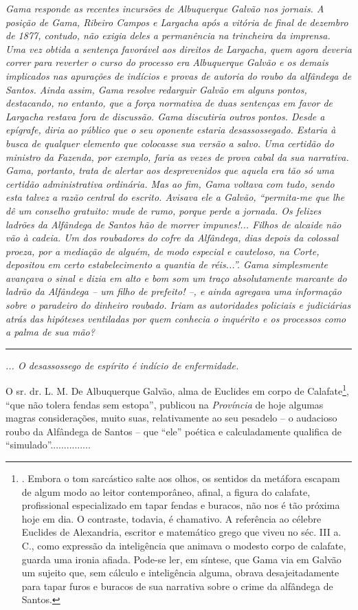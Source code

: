 \emph{Gama responde as recentes incursões de Albuquerque Galvão nos
jornais. A posição de Gama, Ribeiro Campos e Largacha após a vitória de
final de dezembro de 1877, contudo, não exigia deles a permanência na
trincheira da imprensa. Uma vez obtida a sentença favorável aos direitos
de Largacha, quem agora deveria correr para reverter o curso do processo
era Albuquerque Galvão e os demais implicados nas apurações de indícios
e provas de autoria do roubo da alfândega de Santos. Ainda assim, Gama
resolve redarguir Galvão em alguns pontos, destacando, no entanto, que a
força normativa de duas sentenças em favor de Largacha restava fora de
discussão. Gama discutiria outros pontos. Desde a epígrafe, diria ao
público que o seu oponente estaria desassossegado. Estaria à busca de
qualquer elemento que colocasse sua versão a salvo. Uma certidão do
ministro da Fazenda, por exemplo, faria as vezes de prova cabal da sua
narrativa. Gama, portanto, trata de alertar aos desprevenidos que aquela
era tão só uma certidão administrativa ordinária. Mas ao fim, Gama
voltava com tudo, sendo esta talvez a razão central do escrito. Avisava
ele a Galvão, ``permita-me que lhe dê um conselho gratuito: mude de
rumo, porque perde a jornada. Os felizes ladrões da Alfândega de Santos
hão de morrer impunes!... Filhos de alcaide não vão à cadeia. Um dos
roubadores do cofre da Alfândega, dias depois da colossal proeza, por a
mediação de alguém, de modo especial e cauteloso, na Corte, depositou em
certo estabelecimento a quantia de réis...''. Gama simplesmente avançava
o sinal e dizia em alto e bom som um traço absolutamente marcante do
ladrão da Alfândega -- um filho de prefeito! --, e ainda agregava uma
informação sobre o paradeiro do dinheiro roubado. Iriam as autoridades
policiais e judiciárias atrás das hipóteses ventiladas por quem conhecia
o inquérito e os processos como a palma de sua mão?}

\begin{center}\rule{0.5\linewidth}{\linethickness}\end{center}

\emph{... O desassossego de espírito é indício de enfermidade.}

O sr. dr. L. M. De Albuquerque Galvão, alma de Euclides em corpo de
Calafate\footnote{. Embora o tom sarcástico salte aos olhos, os sentidos
  da metáfora escapam de algum modo ao leitor contemporâneo, afinal, a
  figura do calafate, profissional especializado em tapar fendas e
  buracos, não nos é tão próxima hoje em dia. O contraste, todavia, é
  chamativo. A referência ao célebre Euclides de Alexandria, escritor e
  matemático grego que viveu no séc. III a. C., como expressão da
  inteligência que animava o modesto corpo de calafate, guarda uma
  ironia afiada. Pode-se ler, em síntese, que Gama via em Galvão um
  sujeito que, sem cálculo e inteligência alguma, obrava
  desajeitadamente para tapar furos e buracos de sua narrativa sobre o
  crime da alfândega de Santos.}, ``que não tolera fendas sem estopa'',
publicou na \emph{Província} de hoje algumas magras considerações, muito
suas, relativamente ao seu pesadelo -- o audacioso roubo da Alfândega de
Santos -- que ``ele'' poética e calculadamente qualifica de
``simulado''...............

